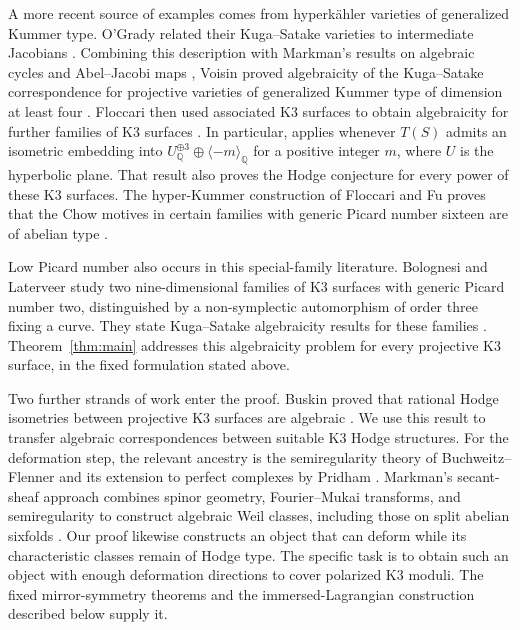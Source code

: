 \documentclass[11pt]{article}
\numberwithin{equation}{section}
\theoremstyle{definition}
\theoremstyle{remark}
\begin{document}
A more recent source of examples comes from hyperk\"ahler
varieties of generalized Kummer type.  O'Grady related their
Kuga--Satake varieties to intermediate Jacobians
\cite{History:OGrady}.  Combining this description with
Markman's results on algebraic cycles and Abel--Jacobi maps
\cite{History:MarkmanKummer}, Voisin proved algebraicity of the
Kuga--Satake correspondence for projective varieties of generalized
Kummer type of dimension at least four
\cite[Theorem~0.5]{History:VoisinKummer}.
Floccari then used associated K3 surfaces to obtain algebraicity
for further families of K3 surfaces
\cite{History:Floccari2024,History:Floccari2026}.  In particular,
\cite[Theorem~5.11]{History:Floccari2026} applies whenever
$T(S)$ admits an isometric embedding into
$U_\mathbb Q^{\oplus 3}\oplus\langle-m\rangle_\mathbb Q$ for a positive
integer $m$, where $U$ is the hyperbolic plane.  That result
also proves the Hodge conjecture for every power of these K3
surfaces.  The hyper-Kummer construction of Floccari and Fu
proves that the Chow motives in certain families with generic
Picard number sixteen are of abelian type
\cite{History:FloccariFu}.

Low Picard number also occurs in this special-family literature.
Bolognesi and Laterveer study two nine-dimensional families of K3
surfaces with generic Picard number two, distinguished by a
non-symplectic automorphism of order three fixing a curve.  They
state Kuga--Satake algebraicity results for these families
\cite[Theorem~4.4, Propositions~6.2 and~6.4]{History:BolognesiLaterveer}.
Theorem~\ref{thm:main} addresses this algebraicity problem for
every projective K3 surface, in the fixed formulation stated
above.

Two further strands of work enter the proof.  Buskin proved that
rational Hodge isometries between projective K3 surfaces are
algebraic \cite{Deformation:Buskin}.  We use this result to
transfer algebraic correspondences between suitable K3 Hodge
structures.  For the deformation step, the relevant ancestry
is the semiregularity theory of Buchweitz--Flenner and its
extension to perfect complexes by Pridham
\cite{Deformation:BF2003,Deformation:Pridham}.
Markman's secant-sheaf approach combines spinor geometry,
Fourier--Mukai transforms, and semiregularity to construct
algebraic Weil classes, including those on split abelian
sixfolds \cite{History:MarkmanSecant,History:MarkmanSurvey}.
Our proof likewise constructs an object that can deform while
its characteristic classes remain of Hodge type.  The
specific task is to obtain such an object with enough
deformation directions to cover polarized K3 moduli.
The fixed mirror-symmetry theorems and the immersed-Lagrangian
construction described below supply it.
\end{document}

